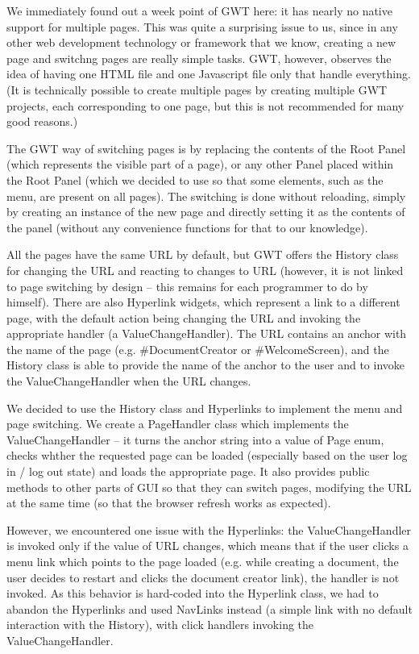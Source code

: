 We immediately found out a week point of GWT here: it has nearly no native support for multiple pages. This was quite a surprising issue to us, since in any other web development technology or framework that we know, creating a new page and switchng pages are really simple tasks. GWT, however, observes the idea of having one HTML file and one Javascript file only that handle everything. (It is technically possible to create multiple pages by creating multiple GWT projects, each corresponding to one page, but this is not recommended for many good reasons.)

The GWT way of switching pages is by replacing the contents of the Root Panel (which represents the visible part of a page), or any other Panel placed within the Root Panel (which we decided to use so that some elements, such as the menu, are present on all pages). The switching is done without reloading, simply by creating an instance of the new page and directly setting it as the contents of the panel (without any convenience functions for that to our knowledge).

All the pages have the same URL by default, but GWT offers the History class for changing the URL and reacting to changes to URL (however, it is not linked to page switching by design -- this remains for each programmer to do by himself). There are also Hyperlink widgets, which represent a link to a different page, with the default action being changing the URL and invoking the appropriate handler (a ValueChangeHandler).
The URL contains an anchor with the name of the page (e.g. \#DocumentCreator or \#WelcomeScreen), and the History class is able to provide the name of the anchor to the user and to invoke the ValueChangeHandler when the URL changes.

We decided to use the History class and Hyperlinks to implement the menu and page switching. We create a PageHandler class which implements the ValueChangeHandler -- it turns the anchor string into a value of Page enum, checks whther the requested page can be loaded (especially based on the user log in / log out state) and loads the appropriate page. It also provides public methods to other parts of GUI so that they can switch pages, modifying the URL at the same time (so that the browser refresh works as expected).

However, we encountered one issue with the Hyperlinks: the ValueChangeHandler is invoked only if the value of URL changes, which means that if the user clicks a menu link which points to the page loaded (e.g. while creating a document, the user decides to restart and clicks the document creator link), the handler is not invoked. As this behavior is hard-coded into the Hyperlink class, we had to abandon the Hyperlinks and used NavLinks instead (a simple link with no default interaction with the History), with click handlers invoking the ValueChangeHandler.

